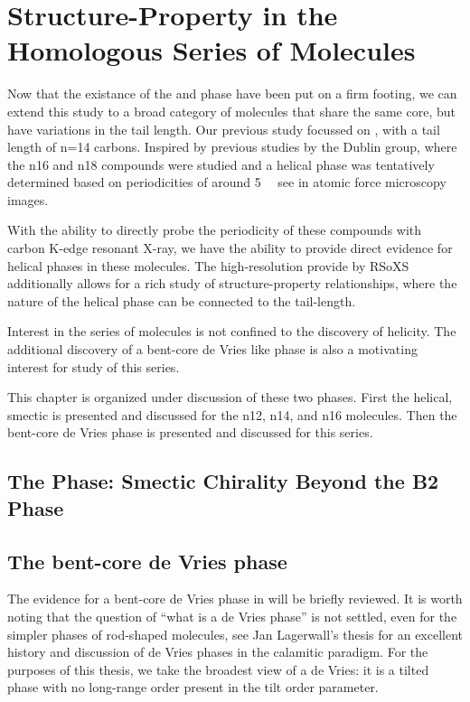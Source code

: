 \documentclass[aagreenthesis]{subfiles}
\begin{document}
\chapter{Structure-Property in the \nfour{} Homologous Series of Molecules}

Now that the existance of the \smcpalpha{} and \smcapa{} phase have been put on
a firm footing, we can extend this study to a broad category of molecules that
share the same core, but have variations in the tail length. Our previous study
focussed on \nfour{}, with a tail length of n=14 carbons. Inspired by
previous studies by the Dublin
group\cite{SreenilayamSpontaneoushelixformation2016,SreenilayamDevelopmentferroelectricitysmectic2017,VijInvestigationheliconicalsmectic2019},
where the n16 and n18 compounds were studied and a helical phase was tentatively
determined based on periodicities of around \SI{5}{\nano\metres} see in atomic
force microscopy images.

With the ability to directly probe the periodicity of these compounds with
carbon K-edge resonant X-ray, we have the ability to provide direct evidence for
helical phases in these molecules. The high-resolution provide by RSoXS
additionally allows for a rich study of structure-property relationships, where
the nature of the helical phase can be connected to the tail-length.

Interest in the \nfour{} series of molecules is not confined to the discovery of
helicity. The additional discovery of a bent-core de Vries like phase is also a
motivating interest for study of this series. 

This chapter is organized under discussion of these two phases. First the
helical, smectic \smcpalpha{} is presented and discussed for the n12, n14, and n16 molecules.
Then the bent-core de Vries phase is presented and discussed for this series.

\section{The \smcpalpha{} Phase: Smectic Chirality Beyond the B2 Phase}


\section{The bent-core de Vries phase}

The evidence for a bent-core de Vries phase in \nfour{} will be briefly
reviewed. It is worth noting that the question of ``what is a de Vries phase''
is not settled, even for the simpler phases of rod-shaped molecules, see Jan
Lagerwall's thesis\cite{jansThesis} for an excellent history and discussion of
de Vries phases in the calamitic paradigm. For the purposes of this thesis, we
take the broadest view of a de Vries: it is a tilted phase with no long-range
order present in the tilt order parameter.
\end{document}
